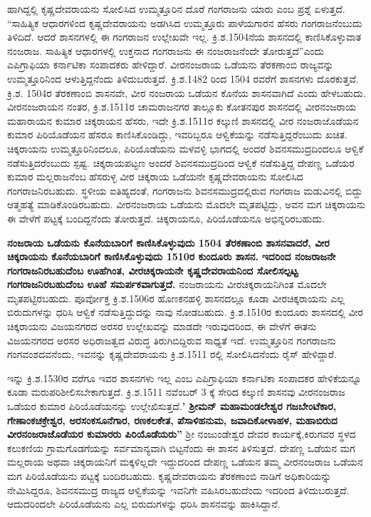ಹಾಗಿದ್ದಲ್ಲಿ ಕೃಷ್ಣದೇವರಾಯನು ಸೋಲಿಸಿದ ಉಮ್ಮತ್ತೂರಿನ ದೊರೆ ಗಂಗರಾಜನು ಯಾರು ಎಂಬ ಪ್ರಶ್ನೆ ಏಳುತ್ತದೆ. “ಸಾಹಿತ್ಯಿಕ ಆಧಾರಗಳಿಂದ ಕೃಷ್ಣದೇವರಾಯನು ಅಡಗಿಸಿದ ಉಮ್ಮತ್ತೂರು ಪಾಳೆಯಗಾರನ ಹೆಸರು ಗಂಗರಾಜನೆಂಬುದು ತಿಳಿದಿದೆ. ಆದರೆ ಶಾಸನಗಳಲ್ಲಿ ಈ ಗಂಗರಾಜನ ಉಲ್ಲೇಖವೇ ಇಲ್ಲ. ಕ್ರಿ.ಶ.1504ನೆಯ ಶಾಸನದಲ್ಲಿ ಕಾಣಿಸಿಕೊಳ್ಳುವಾತ ನಂಜರಾಜ. ಸಾಹಿತ್ಯಿಕ ಆಧಾರಗಳಲ್ಲಿ ಉಕ್ತನಾದ ಗಂಗರಾಜನು ಈ ನಂಜರಾಜನೆಂದೇ ತೋರುತ್ತದೆ”ಎಂದು ಎಪಿಗ್ರಾಫಿಯಾ ಕರ್ನಾಟಿಕಾ ಸಂಪಾದಕರು ಹೇಳಿದ್ದಾರೆ. ವೀರನಂಜರಾಯ ಒಡೆಯನು ತೆರಕಣಾಂಬಿ ರಾಜ್ಯವನ್ನು ಉಮ್ಮತ್ತೂರಿನಿಂದ ಆಳುತ್ತಿದ್ದನೆಂದು ತಿಳಿದುಬರುತ್ತದೆ. ಕ್ರಿ.ಶ.1482 ರಿಂದ 1504 ರವರೆಗೆ ಶಾಸನಗಳು ದೊರಕುತ್ತವೆ. ಕ್ರಿ.ಶ. 1504ರ ತೆರಕಣಾಂಬಿ ಶಾಸನವೇ, ವೀರ ನಂಜರಾಯ ಒಡೆಯನ ಕೊನೆಯ ಶಾಸನವಾಗಿದೆ ಎಂದು ಹೇಳಬಹುದು. ವೀರನಂಜರಾಯನ ನಂತರ, ಕ್ರಿ.ಶ.1511ರ ಚಾಮರಾಜನಗರ ತಾಲ್ಲೂಕು ಕೋತನಪುರ ಶಾಸನದಲ್ಲಿ ವೀರನಂಜರಾಯ ಮಹಾರಾಯನ ಕುಮಾರ ಚಿಕ್ಕರಾಯನ ಹೆಸರು, ಇದೇ ಕ್ರಿ.ಶ.1511ರ ಕಲ್ಕುಣಿ ಶಾಸನದಲ್ಲಿ ವೀರ ನಂಜರಾಜೊಡೆಯನ ಕುಮಾರ ಪಿರಿಯೊಡೆಯನ ಹೆಸರೂ ಕಾಣಿಸಿಕೊಂಡಿದ್ದು, ಇವರಿಬ್ಬರೂ ಆಳ್ವಿಕೆಯನ್ನು ನಡೆಸುತ್ತಿದ್ದರೆಂಬುದು ಖಚಿತ. ಚಿಕ್ಕರಾಯನು ಉಮ್ಮತ್ತೂರಿನಿಂದಲೂ, ಪಿರಿಯೊಡೆಯನು ಮಳವಳ್ಳಿ ಭಾಗದಲ್ಲಿ ಅಂದರೆ ಶಿವನಸಮುದ್ರದಿಂದಲೂ ಆಳ್ವಿಕೆ ನಡೆಸುತ್ತಿದರೆಂಬುದು ಸ್ಪಷ್ಟ. ಚಿಕ್ಕರಾಯಪಟ್ಟಣ ಅಂದರೆ ಶಿವನಸಮುದ್ರದಿಂದ ಆಳ್ವಿಕೆ ನಡೆಸುತ್ತಿದ್ದ ದೇಪಣ್ಣ ಒಡೆಯರ ಕುಮಾರ ಮಲ್ಲರಾಜನೆಂಬ ಹೆಸರುಳ್ಳ ವೀರ ಚಿಕ್ಕರಾಯ ಒಡೆಯನೇ ಕೃಷ್ಣದೇವರಾಯನು ಸೋಲಿಸಿದ ಗಂಗರಾಜನಿರಬಹುದು. ಸ್ಥಳೀಯ ಐತಿಹ್ಯದಂತೆ, ಗಂಗರಾಜನು ಶಿವನಸಮುದ್ರದಲ್ಲಿರುವ ಗಂಗರಾಜ ಮಡುವಿನಲ್ಲಿ ಬಿದ್ದು ಆತ್ಮಹತ್ಯೆ ಮಾಡಿಕೊಂಡಿರಬಹುದು. ವೀರನಂಜರಾಯ ಒಡೆಯನು ಮೊದಲೇ ಮೃತಪಟ್ಟಿದ್ದು, ಅವನ ಮಗ ಚಿಕ್ಕರಾಯನು ಈ ವೇಳೆಗೆ ಪಟ್ಟಕ್ಕೆ ಬಂದಿದ್ದನೆಂದು ತೋರುತ್ತದೆ. ಚಿಕ್ಕರಾಯನೂ, ಪಿರಿಯೊಡೆಯನೂ ಅಭಿನ್ನರಿರಬಹುದು. 

\textbf{ನಂಜರಾಯ ಒಡೆಯನು ಕೊನೆಯಬಾರಿಗೆ ಕಾಣಿಸಿಕೊಳ್ಳುವುದು 1504 ತೆರಕಣಾಂಬಿ ಶಾಸನವಾದರೆ, ವೀರ ಚಿಕ್ಕರಾಯನು ಕೊನೆಯಬಾರಿಗೆ ಕಾಣಿಸಿಕೊಳ್ಳುವುದು 1510ರ ಕುಂದೂರು ಶಾಸನ.} \textbf{ಇದರಿಂದ ನಂಜರಾಜನೇ ಗಂಗರಾಜನಿರಬಹುದೆಂಬ ಊಹೆಗಿಂತ, ವೀರಚಿಕ್ಕರಾಯನೇ ಕೃಷ್ಣದೇವರಾಯನಿಂದ ಸೋಲಿಸಲ್ಪಟ್ಟ ಗಂಗರಾಜನಿರಬಹುದೆಂಬ ಊಹೆ ಸಮರ್ಪಕವಾಗುತ್ತದೆ.} ನಂಜರಾಯನು ವೀರಚಿಕ್ಕರಾಯನಿಗಿಂತ ಮೊದಲೇ ಮೃತಪಟ್ಟಿರಬಹುದು. ಪೂರ್ವೋಕ್ತ ಕ್ರಿ.ಶ.1506ರ ಹೊಣಕನಹಳ್ಳಿ ಶಾಸನದಲ್ಲೂ ಕೂಡಾ ವೀರಚಿಕ್ಕರಾಯನು ಎಲ್ಲ ಬಿರುದುಗಳನ್ನು ಧರಿಸಿ ಆಳ್ವಿಕೆ ನಡೆಸುತ್ತಿದ್ದುದನ್ನು ನಾವು ನೋಡಬಹುದು. ಕ್ರಿ.ಶ.1510ರ ಕುಂದೂರು ಶಾಸನದಲ್ಲಿ ವೀರ ಚಿಕ್ಕರಾಯನು ವಿಜಯನಗರದ ಅರಸರ ಉಲ್ಲೇಖವನ್ನು ಮಾಡದೇ ಇರುವುದರಿಂದ, ಈ ವೇಳೆಗೆ ಈತನು ವಿಜಯನಗರದ ಅರಸರ ಅಧಿರಾಜತ್ವದ ವಿರುದ್ಧ ತಿರುಗಿಬಿದ್ದಿರುವ ಸಾಧ್ಯತೆ ಇದೆ. ಉಮ್ಮತ್ತೂರಿನ ಗಂಗರಾಜನು ಗಂಗವಂಶದವನೆಂದು, ಇವನನ್ನು ಕೃಷ್ಣದೇವರಾಯನು ಕ್ರಿ.ಶ.1511 ರಲ್ಲಿ ಸೋಲಿಸಿದನೆಂದು ರೈಸ್​ ಹೇಳಿದ್ದಾರೆ.

ಇನ್ನು ಕ್ರಿ.ಶ.1530ರ ವರೆಗೂ ಇವರ ಶಾಸನಗಳು ಇಲ್ಲ ಎಂಬ ಎಪಿಗ್ರಾಫಿಯಾ ಕರ್ನಾಟಿಕಾ ಸಂಪಾದಕರ ಹೇಳಿಕೆಯನ್ನೂ ಕೂಡಾ ಮರುಪರಿಶೀಲಿಸಬೇಕಾಗುತ್ತದೆ. ಕ್ರಿ.ಶ.1511 ನವೆಂಬರ್​ 3 ಕ್ಕೆ ಸೇರಿದ ಕಲ್ಕುಣಿ ಶಾಸನವು ವೀರನಂಜರಾಜ ಒಡೆಯರ ಕುಮಾರ ಪಿರಿಯೊಡೆಯನನ್ನು ಉಲ್ಲೇಖಿಸುತ್ತದೆ.\textbf{' ಶ‍್ರೀಮನ್​ ಮಹಾಮಂಡಲೇಶ್ವರ ಗಜಬೇಂಟೆಕಾರ, ಗೇಣಾಂಕಚಕ್ರೇಶ್ವರ, ಅರಸಂಕಸೂನೆಗಾರ, ರಣಕಲಕೇತ, ಪೆಸಾಳಿಹನುಮ, ಜವಾದಿಕೋಳಾಹಳ, ಮಹಾಬಿರುದ ವೀರನಂಜರಾಜೊಡೆಯರ ಕುಮಾರರು ಪಿರಿಯೊಡೆಯರು''} ಶ‍್ರೀ ನಂಜುಂಡೇಶ್ವರ ದೇವರ ಕಾರ್ಯಕ್ಕೆ,ಕಿರುಗವರ ಸ್ಥಳದ ಕಲುಕಣಿಯ ಗ್ರಾಮಗೊಡಗೆಯನ್ನು ಸರ್ವಮಾನ್ಯವಾಗಿ ಬಿಟ್ಟನೆಂದು ಈ ಶಾಸನ ತಿಳಿಸುತ್ತದೆ. ದೇಪಣ್ಣ ಒಡೆಯನ ಮಗ ಮಲ್ಲರಾಯ ಅಥವಾ ಚಿಕ್ಕರಾಯನಿಗೆ ಮಕ್ಕಳಿಲ್ಲದೇ ಇದ್ದುದರಿಂದ ದೇಪಣ್ಣ ಒಡೆಯನ ತಮ್ಮ ವೀರನಂಜರಾಜ ಒಡೆಯನ ಮಗ ಪಿರಿಯೊಡೆಯನು ಪಟ್ಟಕ್ಕೆ ಬಂದಿರಬಹುದು. ಕೃಷ್ಣದೇವರಾಯನು ತೆರಕಣಾಂಬಿ ನಾಡಿಗೆ ಅಧಿಕಾರಿಯನ್ನು ನೇಮಿಸಿದ್ದರೂ, ಶಿವನಸಮುದ್ರ ರಾಜ್ಯದ ಆಳ್ವಿಕೆಯನ್ನು ಇವನಿಗೇ ವಹಿಸಿರಬಹುದೆಂದು ಇದರಿಂದ ತಿಳಿದುಬರುತ್ತದೆ. ಆದುದರಿಂದಲೇ ಪಿರಿಯೊಡೆಯನು ಎಲ್ಲ ಬಿರುದುಗಳನ್ನು ಧರಿಸಿ ಶಾಸನವನ್ನು ಹಾಕಿಸಿದ್ದಾನೆ. 

